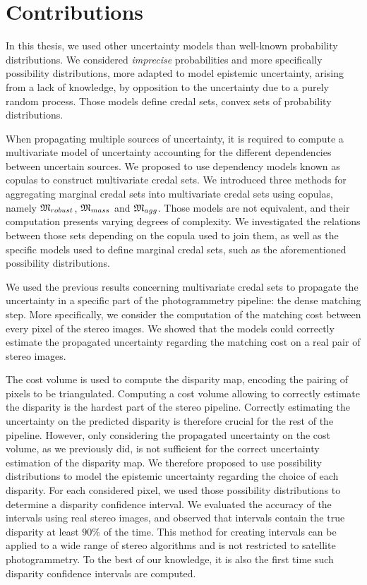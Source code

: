 \section*{Contributions}
In this thesis, we used other uncertainty models than well-known probability distributions. We considered \textit{imprecise} probabilities and more specifically possibility distributions, more adapted to model epistemic uncertainty, \ie arising from a lack of knowledge, by opposition to the uncertainty due to a purely random process. Those models define credal sets, \ie convex sets of probability distributions. 

When propagating multiple sources of uncertainty, it is required to compute a multivariate model of uncertainty accounting for the different dependencies between uncertain sources. We proposed to use dependency models known as copulas to construct multivariate credal sets. We introduced three methods for aggregating marginal credal sets into multivariate credal sets using copulas, namely $\mathfrak{M}_{robust}$, $\mathfrak{M}_{mass}$ and $\mathfrak{M}_{agg}$. Those models are not equivalent, and their computation presents varying degrees of complexity. We investigated the relations between those sets depending on the copula used to join them, as well as the specific models used to define marginal credal sets, such as the aforementioned possibility distributions.

We used the previous results concerning multivariate credal sets to propagate the uncertainty in a specific part of the photogrammetry pipeline: the dense matching step. More specifically, we consider the computation of the matching cost between every pixel of the stereo images. We showed that the models could correctly estimate the propagated uncertainty regarding the matching cost on a real pair of stereo images.

The cost volume is used to compute the disparity map, encoding the pairing of pixels to be triangulated. Computing a cost volume allowing to correctly estimate the disparity is the hardest part of the stereo pipeline. Correctly estimating the uncertainty on the predicted disparity is therefore crucial for the rest of the pipeline. However, only considering the propagated uncertainty on the cost volume, as we previously did, is not sufficient for the correct uncertainty estimation of the disparity map. We therefore proposed to use possibility distributions to model the epistemic uncertainty regarding the choice of each disparity. For each considered pixel, we used those possibility distributions to determine a disparity confidence interval. We evaluated the accuracy of the intervals using real stereo images, and observed that intervals contain the true disparity at least $90\%$ of the time. This method for creating intervals can be applied to a wide range of stereo algorithms and is not restricted to satellite photogrammetry. To the best of our knowledge, it is also the first time such disparity confidence intervals are computed. 

